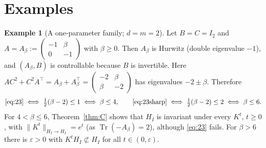 \documentclass[11pt]{article}
\theoremstyle{definition}
\newtheorem{example}[lemma]{Example}
\theoremstyle{remark}
\newcommand{\Tr}{\operatorname{Tr}}
\newcommand{\tp}{\top}
\begin{document}
\section{Examples}\label{sec:examples}

\begin{example}[A one-parameter family; $d=m=2$]\label{ex:beta}
Let $B=C=I_2$ and $A=A_\beta:=\begin{pmatrix}-1&\beta\\0&-1\end{pmatrix}$ with $\beta\ge0$. Then $A_\beta$ is Hurwitz (double
eigenvalue $-1$), and $(A_\beta,B)$ is controllable because $B$ is invertible. Here
$AC^2+C^2A^\tp=A_\beta+A_\beta^\tp=\begin{pmatrix}-2&\beta\\\beta&-2\end{pmatrix}$ has eigenvalues $-2\pm\beta$. Therefore
\[
\eqref{eq:23}\iff\tfrac12(\beta-2)\le1\iff\beta\le4,\qquad
\eqref{eq:23sharp}\iff\tfrac12(\beta-2)\le2\iff\beta\le6 .
\]
For $4<\beta\le6$, Theorem~\ref{thm:C} shows that $H_{I}$ is invariant under every $K^t$, $t\ge0$, with
$\|K^t\|_{H_I\to H_I}=e^{t}$ (as $\Tr(-A_\beta)=2$), although \eqref{eq:23} fails. For $\beta>6$ there is
$\varepsilon>0$ with $K^tH_I\not\subset H_I$ for all $t\in(0,\varepsilon)$.


\end{example}
\end{document}
